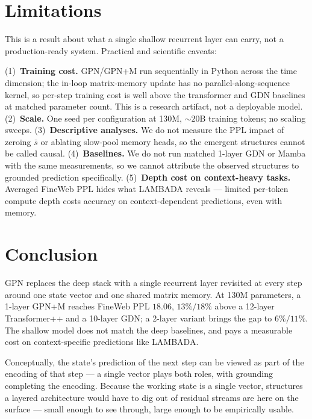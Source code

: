 \documentclass{article}
\begin{document}
\FloatBarrier

\section{Limitations}

This is a result about what a single shallow recurrent layer can
carry, not a production-ready system. Practical and scientific
caveats:

(1)~\textbf{Training cost.} GPN/GPN+M run sequentially in Python
across the time dimension; the in-loop matrix-memory update has no
parallel-along-sequence kernel, so per-step training cost is well
above the transformer and GDN baselines at matched parameter count.
This is a research artifact, not a deployable model.
(2)~\textbf{Scale.} One seed per configuration at 130M, $\sim 20$B
training tokens; no scaling sweeps.
(3)~\textbf{Descriptive analyses.} We do not measure the PPL impact
of zeroing $\bar s$ or ablating slow-pool memory heads, so the
emergent structures cannot be called causal.
(4)~\textbf{Baselines.} We do not run matched 1-layer GDN or Mamba
with the same measurements, so we cannot attribute the observed
structures to grounded prediction specifically.
(5)~\textbf{Depth cost on context-heavy tasks.} Averaged FineWeb PPL
hides what LAMBADA reveals --- limited per-token compute depth costs
accuracy on context-dependent predictions, even with memory.


\section{Conclusion}

GPN replaces the deep stack with a single recurrent layer revisited
at every step around one state vector and one shared matrix memory.
At 130M parameters, a 1-layer GPN+M reaches FineWeb PPL $18.06$,
$13\%/18\%$ above a 12-layer Transformer++ and a 10-layer GDN; a
2-layer variant brings the gap to $6\%/11\%$. The shallow model
does not match the deep baselines, and pays a measurable cost on
context-specific predictions like LAMBADA.

Conceptually, the state's prediction of the next step can be viewed
as part of the encoding of that step --- a single vector plays both
roles, with grounding completing the encoding. Because the working
state is a single vector, structures a layered architecture would
have to dig out of residual streams are here on the surface ---
small enough to see through, large enough to be empirically usable.



\end{document}
